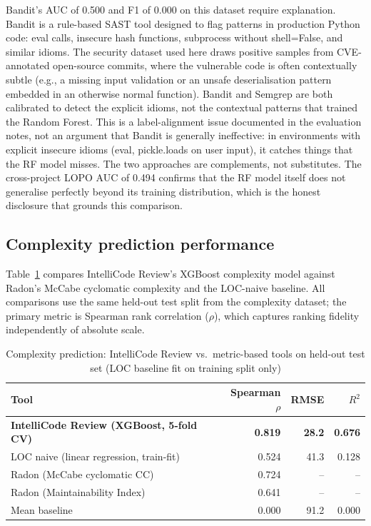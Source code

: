 \documentclass[12pt, oneside]{report}
\begin{document}
Bandit's AUC of 0.500 and F1 of 0.000 on this dataset require explanation. Bandit is a
rule-based SAST tool designed to flag patterns in production Python code: eval calls, insecure hash functions, subprocess without shell=False, and similar idioms. The security
dataset used here draws positive samples from CVE-annotated open-source commits, where the
vulnerable code is often contextually subtle (e.g., a missing input validation or an
unsafe deserialisation pattern embedded in an otherwise normal function). Bandit and
Semgrep are both calibrated to detect the explicit idioms, not the contextual patterns that
trained the Random Forest. This is a label-alignment issue documented in the evaluation
notes, not an argument that Bandit is generally ineffective: in environments with
explicit insecure idioms (eval, pickle.loads on user input), it catches things that the
RF model misses. The two approaches are complements, not substitutes. The cross-project
LOPO AUC of 0.494 confirms that the RF model itself does not generalise perfectly
beyond its training distribution, which is the honest disclosure that grounds this
comparison.

\subsection{Complexity prediction performance}

Table~\ref{tab:market-complexity} compares IntelliCode Review's XGBoost complexity
model against Radon's McCabe cyclomatic complexity and the LOC-naive baseline. All
comparisons use the same held-out test split from the complexity dataset; the primary
metric is Spearman rank correlation ($\rho$), which captures ranking fidelity
independently of absolute scale.

\begin{table}[H]
\centering
\caption{Complexity prediction: IntelliCode Review vs.\ metric-based tools on held-out test set (LOC baseline fit on training split only)}
\label{tab:market-complexity}
\begin{tabular}{@{}lrrr@{}}
\toprule
\textbf{Tool} & \textbf{Spearman $\rho$} & \textbf{RMSE} & \textbf{$R^2$} \\
\midrule
\textbf{IntelliCode Review (XGBoost, 5-fold CV)} & \textbf{0.819} & \textbf{28.2} & \textbf{0.676} \\
LOC naive (linear regression, train-fit)      & 0.524          & 41.3          & 0.128          \\
Radon (McCabe cyclomatic CC)                  & 0.724          & --            & --             \\
Radon (Maintainability Index)                 & 0.641          & --            & --             \\
Mean baseline                                 & 0.000          & 91.2          & 0.000          \\
\bottomrule
\end{tabular}
\end{table}
\end{document}
